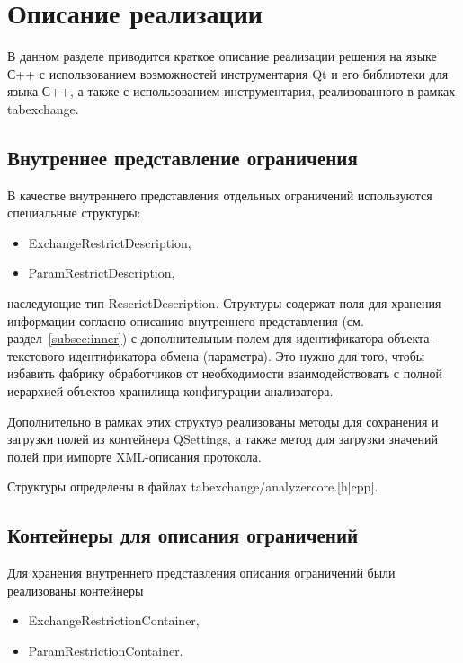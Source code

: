 \section{Описание реализации}

В данном разделе приводится краткое описание реализации решения на языке С++ с 
использованием возможностей инструментария Qt и его библиотеки для языка С++, а 
также с использованием инструментария, реализованного в рамках tabexchange.

\subsection{Внутреннее представление ограничения}

В качестве внутреннего представления отдельных ограничений используются 
специальные структуры: 

\begin{itemize}
 \item ExchangeRestrictDescription,
 \item ParamRestrictDescription,
\end{itemize}

наследующие тип RescrictDescription. Структуры содержат поля для хранения 
информации согласно описанию внутреннего представления (см. 
раздел~\ref{subsec:inner}) с дополнительным полем для идентификатора объекта - 
текстового идентификатора обмена (параметра). Это нужно для того, чтобы 
избавить фабрику обработчиков от необходимости взаимодействовать с полной 
иерархией объектов хранилища конфигурации анализатора.

Дополнительно в рамках этих структур реализованы методы для сохранения и 
загрузки полей из контейнера QSettings, а также метод для загрузки 
значений полей при импорте XML-описания протокола.

Структуры определены в файлах tabexchange/analyzercore.[h|cpp].

\subsection{Контейнеры для описания ограничений}

Для хранения внутреннего представления описания ограничений были реализованы 
контейнеры
\begin{itemize}
 \item ExchangeRestrictionContainer,
 \item ParamRestrictionContainer.
\end{itemize}

